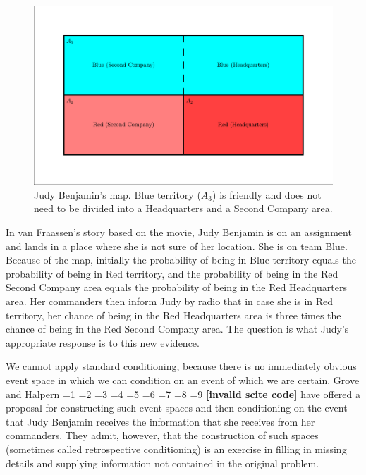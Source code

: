 \documentclass[smallextended]{svjour3}       %
\newcommand{\PageP}{p.~}
\newcommand{\PageP}{}
\newcommand{\scite}[3]{\ifnum#1=1\cite{#2}\else
\ifnum#1=2\cite[{\PageP}~#3]{#2}\else
\ifnum#1=3\cite[{\PageP}~#3]{#2}\else
\ifnum#1=4\cite{#2}\else
\ifnum#1=5\cite{#2}\else
\ifnum#1=6\cite[{\PageP}~#3]{#2}\else
\ifnum#1=7\cite{#2}\else
\ifnum#1=8\cite[{\PageP}~#3]{#2}\else
\ifnum#1=9\cite[{\PageP}~#3]{#2}\else
\textbf{[invalid scite code]}\fi\fi\fi\fi\fi\fi\fi\fi\fi}
\begin{document}
\begin{figure}[h!]
  \begin{flushright}
    \begin{minipage}[h]{.8\linewidth}
      \includegraphics[width=\textwidth]{judy.eps}
      \caption{Judy Benjamin's map. Blue territory ($A_{3}$) is friendly and
        does not need to be divided into a Headquarters and a Second
        Company area.}
      \label{fig:map}
    \end{minipage}
  \end{flushright}
\end{figure}

In van Fraassen's story based on the movie, Judy Benjamin is on an
assignment and lands in a place where she is not sure of her location.
She is on team Blue. Because of the map, initially the probability of
being in Blue territory equals the probability of being in Red
territory, and the probability of being in the Red Second Company area
equals the probability of being in the Red Headquarters area. Her
commanders then inform Judy by radio that in case she is in Red
territory, her chance of being in the Red Headquarters area is three
times the chance of being in the Red Second Company area. The question
is what Judy's appropriate response is to this new evidence.

We cannot apply standard conditioning, because there is no immediately
obvious event space in which we can condition on an event of which we
are certain. Grove and Halpern \scite{1}{grovehalpern97}{} have
offered a proposal for constructing such event spaces and then
conditioning on the event that Judy Benjamin receives the information
that she receives from her commanders. They admit, however, that the
construction of such spaces (sometimes called retrospective
conditioning) is an exercise in filling in missing details and
supplying information not contained in the original problem.
\end{document}
